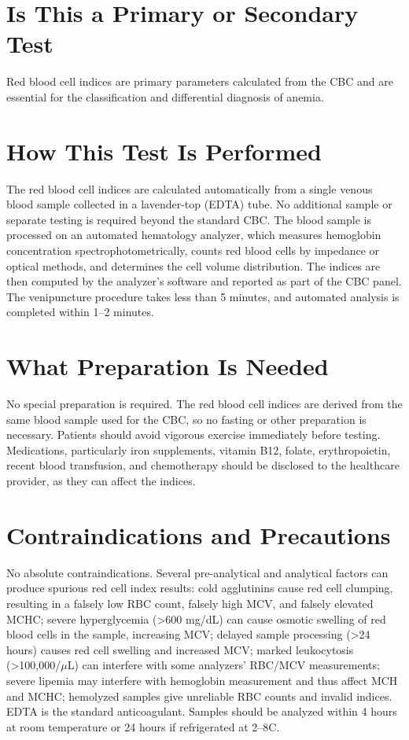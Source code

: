 \section*{Is This a Primary or Secondary Test}
Red blood cell indices are primary parameters calculated from the CBC and are essential for the classification and differential diagnosis of anemia.

\section*{How This Test Is Performed}
The red blood cell indices are calculated automatically from a single venous blood sample collected in a lavender-top (EDTA) tube. No additional sample or separate testing is required beyond the standard CBC. The blood sample is processed on an automated hematology analyzer, which measures hemoglobin concentration spectrophotometrically, counts red blood cells by impedance or optical methods, and determines the cell volume distribution. The indices are then computed by the analyzer's software and reported as part of the CBC panel. The venipuncture procedure takes less than 5 minutes, and automated analysis is completed within 1--2 minutes.

\section*{What Preparation Is Needed}
No special preparation is required. The red blood cell indices are derived from the same blood sample used for the CBC, so no fasting or other preparation is necessary. Patients should avoid vigorous exercise immediately before testing. Medications, particularly iron supplements, vitamin B12, folate, erythropoietin, recent blood transfusion, and chemotherapy should be disclosed to the healthcare provider, as they can affect the indices.

\section*{Contraindications and Precautions}
No absolute contraindications. Several pre-analytical and analytical factors can produce spurious red cell index results: cold agglutinins cause red cell clumping, resulting in a falsely low RBC count, falsely high MCV, and falsely elevated MCHC; severe hyperglycemia (>600 mg/dL) can cause osmotic swelling of red blood cells in the sample, increasing MCV; delayed sample processing (>24 hours) causes red cell swelling and increased MCV; marked leukocytosis (>100,000/$\mu$L) can interfere with some analyzers' RBC/MCV measurements; severe lipemia may interfere with hemoglobin measurement and thus affect MCH and MCHC; hemolyzed samples give unreliable RBC counts and invalid indices. EDTA is the standard anticoagulant. Samples should be analyzed within 4 hours at room temperature or 24 hours if refrigerated at 2--8\textdegree{}C.

